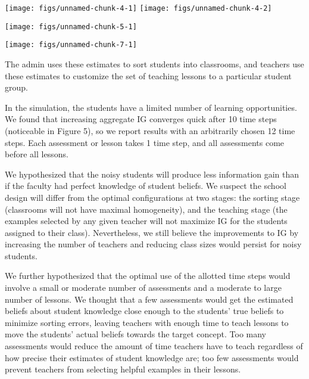 \documentclass[man]{apa6}
\newenvironment{CodeChunk}{}{}
\begin{document}
\begin{CodeChunk}

\texttt{[image: figs/unnamed-chunk-4-1]} 
\texttt{[image: figs/unnamed-chunk-4-2]} \end{CodeChunk}

\begin{CodeChunk}

\texttt{[image: figs/unnamed-chunk-5-1]} \end{CodeChunk}

\begin{CodeChunk}

\texttt{[image: figs/unnamed-chunk-7-1]} \end{CodeChunk}

The admin uses these estimates to sort students into classrooms, and
teachers use these estimates to customize the set of teaching lessons to
a particular student group.

In the simulation, the students have a limited number of learning
opportunities. We found that increasing aggregate IG converges quick
after 10 time steps (noticeable in Figure 5), so we report results with
an arbitrarily chosen 12 time steps. Each assessment or lesson takes 1
time step, and all assessments come before all lessons.

We hypothesized that the noisy students will produce less information
gain than if the faculty had perfect knowledge of student beliefs. We
suspect the school design will differ from the optimal configurations at
two stages: the sorting stage (classrooms will not have maximal
homogeneity), and the teaching stage (the examples selected by any given
teacher will not maximize IG for the students assigned to their class).
Nevertheless, we still believe the improvements to IG by increasing the
number of teachers and reducing class sizes would persist for noisy
students.

We further hypothesized that the optimal use of the allotted time steps
would involve a small or moderate number of assessments and a moderate
to large number of lessons. We thought that a few assessments would get
the estimated beliefs about student knowledge close enough to the
students' true beliefs to minimize sorting errors, leaving teachers with
enough time to teach lessons to move the students' actual beliefs
towards the target concept. Too many assessments would reduce the amount
of time teachers have to teach regardless of how precise their estimates
of student knowledge are; too few assessments would prevent teachers
from selecting helpful examples in their lessons.
\end{document}
